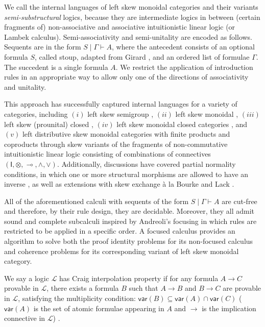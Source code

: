\documentclass[sn-mathphys-num]{sn-jnl}%
\newcommand{\GG}{\Gamma}
\newcommand{\GT}{\Theta}
\newcommand{\vd}{\vdash}
\newcommand{\ot}{\otimes}
\newcommand{\lolli}{\multimap}
\newcommand{\I}{\mathsf{I}}
\newcommand{\mc}[1]{\mathcal{#1}}
\newcommand{\mf}[1]{\mathsf{#1}}
\newcommand{\vars}[1]{\mf{var} (#1)}
\theoremstyle{thmstyleone}%
\theoremstyle{thmstyletwo}%
\theoremstyle{thmstylethree}%
\begin{document}
We call the internal languages of left skew monoidal categories and their variants \emph{semi-substructural} logics, because they are intermediate logics in between (certain fragments of) non-associative and associative intuitionistic linear logic (or Lambek calculus).
Semi-associativity and semi-unitality are encoded as follows.
Sequents are in the form $S \mid \Gamma \vdash A$, where the antecedent consists of an optional formula $S$, called stoup, adapted from Girard \cite{girard:constructive:91}, and an ordered list of formulae $\Gamma$.
The succedent is a single formula $A$.
We restrict the application of introduction rules in an appropriate way to allow only one of the directions of associativity and unitality.

This approach has successfully captured internal languages for a variety of categories, including  $(i)$ left skew semigroup \cite{zeilberger:semiassociative:19}, $(ii)$ left skew monoidal \cite{uustalu:sequent:2021}, $(iii)$ left skew (prounital) closed \cite{uustalu:deductive:nodate}, $(iv)$ left skew monoidal closed categories \cite{UVW:protsn,veltri:multifocus:23}, and $(v)$ left distributive skew monoidal categories with finite products and coproducts \cite{VW:2023} through skew variants of the fragments of non-commutative intuitionistic linear logic consisting of combinations of connectives $(\I,\ot,\lolli,\land,\lor)$.
Additionally, discussions have covered partial normality conditions, in which one or more structural morphisms are allowed to have an inverse \cite{uustalu:proof:nodate}, as well as extensions with skew exchange \`a la Bourke and Lack \cite{veltri:coherence:2021,VW:2023}.

All of the aforementioned calculi with sequents of the form $S \mid \GG \vd A$ are cut-free and therefore, by their rule design, they are decidable.
Moreover, they all admit sound and complete subcalculi inspired by Andreoli's focusing \cite{andreoli:logic:1992} in which
rules are restricted to be applied in a specific order.
A focused calculus provides an algorithm to solve both the proof identity problems for its non-focused calculus and coherence problems for its corresponding variant of left skew monoidal category.

We say a logic $\mc{L}$ has Craig interpolation property if for any formula $A \to C$ provable in $\mc{L}$, there exists a formula $B$ such that $A \to B$ and $B \to C$ are provable in $\mc{L}$, satisfying the multiplicity condition: $\vars{B} \subseteq \vars{A} \cap \vars{C}$ ($\vars{A}$ is the set of atomic formulae appearing in $A$ and $\to$ is the implication connective in $\mc{L}$) \cite{craig:interpolation:1957}.
\end{document}
